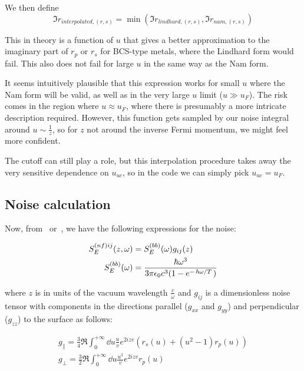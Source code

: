 \documentclass[../main.tex]{subfiles}
\begin{document}
	We then define
	\begin{equation}
		\Im r_{interpolated, (r, s)} = \min(\Im r_{lindhard, (r, s)}, \Im r_{nam, (r, s)})
	\end{equation}

	This in theory is a function of $u$ that gives a better approximation to the imaginary part of $r_p$ or $r_s$ for BCS-type metals, where the Lindhard form would fail.
	This also does not fail for large $u$ in the same way as the Nam form.

	It seems intuitively plausible that this expression works for small $u$ where the Nam form will be valid, as well as in the very large $u$ limit ($u \gg u_F$).
	The risk comes in the region where $u \approx u_F$, where there is presumably a more intricate description required.
	However, this function gets sampled by our noise integral around $u \sim \frac{1}{z}$, so for $z$ not around the inverse Fermi momentum, we might feel more confident.

	The cutoff can still play a role, but this interpolation procedure takes away the very sensitive dependence on $u_{uc}$, so in the code we can simply pick $u_{uc} = u_F$.

	\subsection{Noise calculation} \label{subsec:nce:noise}

	Now, from~\cite{Henkel1999} or~\cite{QubitRelax}, we have the following expressions for the noise:

	\begin{align}
		S^{(nf)ij}_E(z, \omega) &= S^{(bb)}_E(\omega) g_{ij}(z) \\
		S^{(bb)}_E(\omega) &= \frac{\hbar \omega^3}{3 \pi \epsilon_0 c^3 (1 - e^{-\flatfrac{\hbar \omega}{T}})}
	\end{align}

	where $z$ is in units of the vacuum wavelength $\frac{c}{\omega}$ and $g_{ij}$ is a dimensionless noise tensor with components in the directions parallel ($g_{xx}$ and $g_{yy}$) and perpendicular ($g_{zz}$) to the surface as follows:

	\begin{gather}
		g_\parallel = \frac34 \Re \int_0^{+\infty} \dd{u} \frac{u}{v} e^{2i z v} \left(r_s(u) + \left(u^2 - 1\right) r_p(u) \right) \\
		g_\perp = \frac32 \Re \int_0^{+\infty} \dd{u} \frac{u^3}{v} e^{2 i z v} r_p(u)
	\end{gather}
\end{document}
